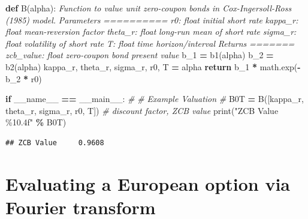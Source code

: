 \documentclass[
]{book}
\newenvironment{Shaded}{\begin{snugshade}}{\end{snugshade}}
\newcommand{\BuiltInTok}[1]{#1}
\newcommand{\CommentTok}[1]{\textcolor[rgb]{0.56,0.35,0.01}{\textit{#1}}}
\newcommand{\ControlFlowTok}[1]{\textcolor[rgb]{0.13,0.29,0.53}{\textbf{#1}}}
\newcommand{\KeywordTok}[1]{\textcolor[rgb]{0.13,0.29,0.53}{\textbf{#1}}}
\newcommand{\NormalTok}[1]{#1}
\newcommand{\OperatorTok}[1]{\textcolor[rgb]{0.81,0.36,0.00}{\textbf{#1}}}
\newcommand{\SpecialCharTok}[1]{\textcolor[rgb]{0.00,0.00,0.00}{#1}}
\newcommand{\StringTok}[1]{\textcolor[rgb]{0.31,0.60,0.02}{#1}}
\newcommand{\VariableTok}[1]{\textcolor[rgb]{0.00,0.00,0.00}{#1}}
\begin{document}
\begin{Shaded}
\begin{Highlighting}[]
\KeywordTok{def}\NormalTok{ B(alpha):}
  \CommentTok{\textquotesingle{}\textquotesingle{}\textquotesingle{} Function to value unit zero{-}coupon bonds in Cox{-}Ingersoll{-}Ross (1985)}
\CommentTok{  model.}
\CommentTok{  Parameters}
\CommentTok{  ==========}
\CommentTok{  r0: float}
\CommentTok{  initial short rate}
\CommentTok{  kappa\_r: float}
\CommentTok{  mean{-}reversion factor}
\CommentTok{  theta\_r: float}
\CommentTok{  long{-}run mean of short rate}
\CommentTok{  sigma\_r: float}
\CommentTok{  volatility of short rate}
\CommentTok{  T: float}
\CommentTok{  time horizon/interval}
\CommentTok{  Returns}
\CommentTok{  =======}
\CommentTok{  zcb\_value: float}
\CommentTok{  zero{-}coupon bond present value}
\CommentTok{  \textquotesingle{}\textquotesingle{}\textquotesingle{}}
\NormalTok{  b\_1 }\OperatorTok{=}\NormalTok{ b1(alpha)}
\NormalTok{  b\_2 }\OperatorTok{=}\NormalTok{ b2(alpha)}
\NormalTok{  kappa\_r, theta\_r, sigma\_r, r0, T }\OperatorTok{=}\NormalTok{ alpha}
  \ControlFlowTok{return}\NormalTok{ b\_1 }\OperatorTok{*}\NormalTok{ math.exp(}\OperatorTok{{-}}\NormalTok{b\_2 }\OperatorTok{*}\NormalTok{ r0)}

\ControlFlowTok{if} \VariableTok{\_\_name\_\_} \OperatorTok{==} \StringTok{\textquotesingle{}\_\_main\_\_\textquotesingle{}}\NormalTok{:}
  \CommentTok{\#}
  \CommentTok{\# Example Valuation}
  \CommentTok{\#}
\NormalTok{  B0T }\OperatorTok{=}\NormalTok{ B([kappa\_r, theta\_r, sigma\_r, r0, T])}
  \CommentTok{\# discount factor, ZCB value}
  \BuiltInTok{print}\NormalTok{(}\StringTok{"ZCB Value }\SpecialCharTok{\%10.4f}\StringTok{"} \OperatorTok{\%}\NormalTok{ B0T)}
\end{Highlighting}
\end{Shaded}

\begin{verbatim}
## ZCB Value     0.9608
\end{verbatim}

\hypertarget{evaluating-a-european-option-via-fourier-transform}{%
\section{Evaluating a European option via Fourier transform}\label{evaluating-a-european-option-via-fourier-transform}}
\end{document}
